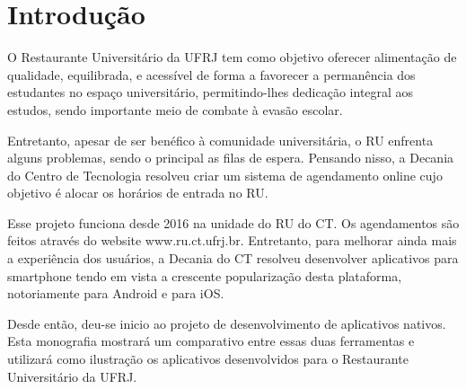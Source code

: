 \chapter{Introdução}

O Restaurante Universitário da UFRJ tem como objetivo oferecer alimentação de qualidade, equilibrada, e 
acessível de forma a favorecer a permanência dos estudantes no espaço universitário, permitindo-lhes 
dedicação integral aos estudos, sendo importante meio de combate à evasão escolar.

Entretanto, apesar de ser benéfico à comunidade universitária, o RU enfrenta alguns problemas, sendo o 
principal as filas de espera. Pensando nisso, a Decania do Centro de Tecnologia resolveu criar um sistema
 de agendamento online cujo objetivo é alocar os horários de entrada no RU.

Esse projeto funciona desde 2016 na unidade do RU do CT. Os agendamentos são feitos através do website
www.ru.ct.ufrj.br. Entretanto, para melhorar ainda mais a experiência dos usuários, a Decania do CT 
resolveu desenvolver aplicativos para smartphone tendo em vista a crescente popularização desta 
plataforma, notoriamente para Android e para iOS.

Desde então, deu-se inicio ao projeto de desenvolvimento de aplicativos nativos. Esta 
monografia mostrará um comparativo entre essas duas ferramentas e utilizará como ilustração
os aplicativos desenvolvidos para o Restaurante Universitário da UFRJ.